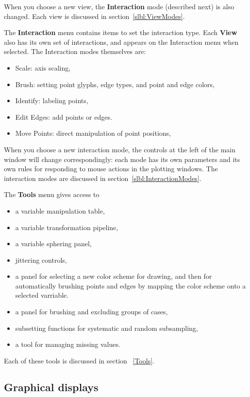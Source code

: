 \documentclass[11pt]{article}
\def\Widget#1{\textbf{#1}}
\begin{document}
When you choose a new view, the \Widget{Interaction} mode (described
next) is also changed.  Each view is discussed in
section~\ref{slbl:ViewModes}.

The \Widget{Interaction} menu contains items to set the interaction type.
Each \Widget{View} also has its own set of interactions, and appears on
the Interaction menu when selected.  The Interaction modes
themselves are:

\begin{itemize}
\itemsep 0em
\item Scale: axis scaling,
\item Brush: setting point glyphs, edge types, and point and edge colors,
\item Identify: labeling points,
\item Edit Edges: add points or edges.
\item Move Points: direct manipulation of point positions,
\end{itemize}

When you choose a new interaction mode, the controls at the left of
the main window will change correspondingly: each mode has its own
parameters and its own rules for responding to mouse actions in the
plotting windows.  The interaction modes are discussed in
section~\ref{slbl:InteractionModes}.

The \Widget{Tools} menu gives access to 
\begin{itemize}
\itemsep 0em
\item a variable manipulation table,
\item a variable transformation pipeline,
\item a variable sphering panel,
\item jittering controls,
\item a panel for selecting a new color scheme for drawing, and
 then for automatically brushing points and edges by mapping the
 color scheme onto a selected varriable.
\item a panel for brushing and excluding groups of cases,
\item subsetting functions for systematic and random subsampling, 
\item a tool for managing missing values.
\end{itemize}

Each of these tools is discussed in section ~\ref{Tools}.

\subsection{Graphical displays}
\label{slbl:GraphicalDisplays}
\end{document}
